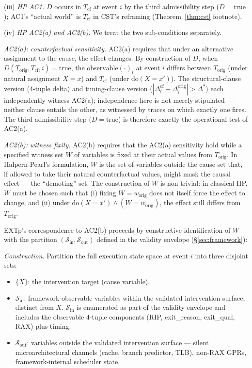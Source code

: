 \documentclass[conference]{IEEEtran}
\newcommand{\Korig}{T_\text{orig}}
\newcommand{\Tcf}{T_\text{cf}}
\newcommand{\Dstar}{\Delta^{*}}
\newcommand{\dox}[1]{\text{do}(X{=}#1)}
\begin{document}
(iii) \emph{HP AC1.} $D$ occurs in $\Tcf$ at event $i$ by the
third admissibility step ($D = \text{true}$); AC1's ``actual
world'' is $\Tcf$ in CST's reframing (Theorem~\ref{thm:cst}
footnote).

(iv) \emph{HP AC2(a) and AC2(b).} We treat the two sub-conditions
separately.

\emph{AC2(a): counterfactual sensitivity.} AC2(a) requires that
under an alternative assignment to the cause, the effect changes.
By construction of $D$, when $D(\Korig, \Tcf, i) = \text{true}$,
the $\text{observable}(\cdot)_i$ at event $i$ differs between
$\Korig$ (under natural assignment $X = x$) and $\Tcf$ (under
$\dox{x'}$). The structural-clause version (4-tuple delta) and
timing-clause version
($|\Delta_i^{\text{cf}} - \Delta_i^{\text{orig}}| > \Dstar$) each
independently witness AC2(a); independence here is not merely
stipulated --- neither clause entails the other, as witnessed by
traces on which exactly one fires. The third admissibility step
($D = \text{true}$) is therefore exactly the operational test of
AC2(a).

\emph{AC2(b): witness fixity.} AC2(b) requires that the AC2(a)
sensitivity hold while a specified witness set $W$ of variables
is fixed at their actual values from $\Korig$. In Halpern-Pearl's
formulation, $W$ is the set of variables outside the cause set
that, if allowed to take their natural counterfactual values,
might mask the causal effect --- the ``demoting'' set. The
construction of $W$ is non-trivial: in classical HP, $W$ must be
chosen such that (i) fixing $W = w_{\text{orig}}$ does not itself
force the effect to change, and (ii) under
$\dox{x'} \wedge (W = w_{\text{orig}})$, the effect still differs
from $\Korig$.

EXTp's correspondence to AC2(b) proceeds by constructive
identification of $W$ with the partition
$(\mathcal{S}_\text{in}, \mathcal{S}_\text{out})$ defined in the
validity envelope (\S\ref{sec:framework}):

\emph{Construction.} Partition the full execution state space at
event $i$ into three disjoint sets:
\begin{itemize}[leftmargin=*]
  \item $\{X\}$: the intervention target (cause variable).
  \item $\mathcal{S}_\text{in}$: framework-observable variables
    within the validated intervention surface, distinct from $X$.
    $\mathcal{S}_\text{in}$ is enumerated as part of the validity
    envelope and includes the
    observable 4-tuple components (RIP, exit\_reason, exit\_qual,
    RAX) plus timing.
  \item $\mathcal{S}_\text{out}$: variables outside the validated
    intervention surface --- silent microarchitectural channels
    (cache, branch predictor, TLB), non-RAX GPRs,
    framework-internal scheduler state.
\end{itemize}
\end{document}

